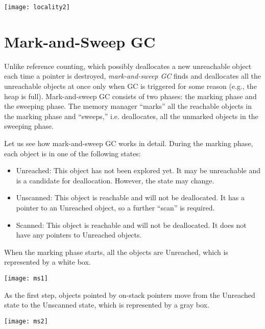 \begin{center}
\texttt{[image: locality2]}
\end{center}

\section{Mark-and-Sweep GC}

Unlike reference counting, which possibly deallocates a new unreachable object
each time a pointer is destroyed, \textit{mark-and-sweep
GC} finds and deallocates all the
unreachable objects at once only when GC is triggered for some reason (e.g., the
heap is full). Mark-and-sweep GC consists of two phases: the marking phase and
the sweeping phase. The memory manager ``marks'' all the reachable objects in
the marking phase and ``sweeps,'' i.e. deallocates, all the unmarked objects in
the sweeping phase.

\newcommand{\urch}{\textsf{Unreached}\xspace}
\newcommand{\uscn}{\textsf{Unscanned}\xspace}
\newcommand{\scn}{\textsf{Scanned}\xspace}

Let us see how mark-and-sweep GC works in detail. During the marking phase, each
object is in one of the following states:
\begin{itemize}
  \item \urch: This object has not been explored yet. It may be unreachable and is a candidate
    for deallocation. However, the state may change.
  \item \uscn: This object is reachable and will not be deallocated. It has a
    pointer to an \urch object, so a further ``scan'' is required.
  \item \scn: This object is reachable and will not be deallocated. It does not
    have any pointers to \urch objects.
\end{itemize}

When the marking phase starts, all the objects are \urch, which is
represented by a white box.

\begin{center}
\texttt{[image: ms1]}
\end{center}

As the first step, objects pointed by on-stack pointers move from the \urch
state to the \uscn state, which is represented by a gray box.

\begin{center}
\texttt{[image: ms2]}
\end{center}

